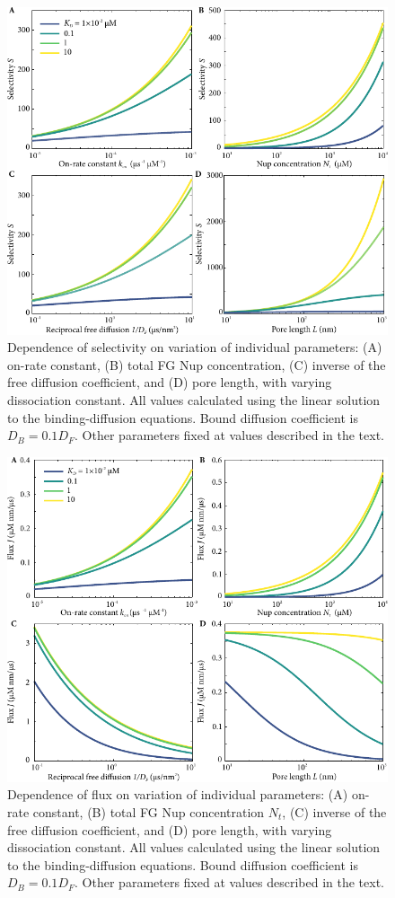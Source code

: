 \begin{figure}
\centering
\includegraphics[width=0.8\linewidth]{figs/ch02/parameter-variations.pdf}
\caption[Dependence of selectivity on model parameters.]{Dependence of selectivity on variation of individual
  parameters: (A) on-rate constant, (B) total FG Nup concentration, (C) inverse of the free diffusion coefficient, and (D) pore
  length, with varying dissociation constant. All values calculated using the linear solution to the binding-diffusion equations.  Bound diffusion coefficient is $D_B = 0.1D_F$. Other parameters fixed at values described in the text.}
\label{fig:parameter-variations}
\end{figure}

\begin{figure}
\centering
\includegraphics[width=0.8\linewidth]{figs/ch02/parameter-variations-abs-flux.pdf}
\caption[Dependence of absolute flux on model parameters.]{Dependence of flux on variation of individual parameters: (A) on-rate constant, (B) total FG Nup concentration $N_t$, (C) inverse
  of the free diffusion coefficient, and (D) pore length, with varying
  dissociation constant. All values calculated using the linear solution to the binding-diffusion equations. Bound diffusion coefficient is $D_B = 0.1D_F$. Other parameters fixed at values described in the text.}
\label{fig:parameter-variations-abs-flux}
\end{figure}

